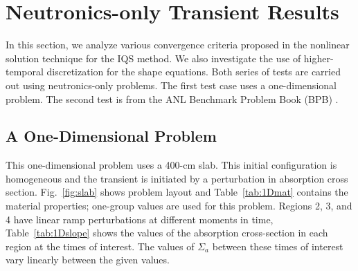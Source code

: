\documentclass{elsarticle}
\newcommand{\fig}[1]{Fig.~\ref{#1}}                      %
\newcommand{\tbl}[1]{Table~\ref{#1}}                     %
\begin{document}

\section{Neutronics-only Transient Results}

In this section, we analyze various convergence criteria proposed in the nonlinear solution technique for the IQS method. We also investigate the use of higher-temporal discretization for the shape equations. Both series of tests are carried out using neutronics-only problems.  The first test case uses a one-dimensional problem. The second test is from the ANL Benchmark Problem Book (BPB) \cite{ANL_BPB}.

\subsection{A One-Dimensional Problem}

This one-dimensional problem uses a 400-cm slab. This initial configuration is homogeneous and the transient is initiated by a perturbation in absorption cross section. \fig{fig:slab} shows problem layout and \tbl{tab:1Dmat} contains the material properties; one-group values are used for this problem. Regions 2, 3, and 4 have linear ramp perturbations at different moments in time, \tbl{tab:1Dslope} shows the values of the absorption cross-section in each region at the times of interest.  The values of $\Sigma_a$ between these times of interest vary linearly between the given values.
\end{document}
